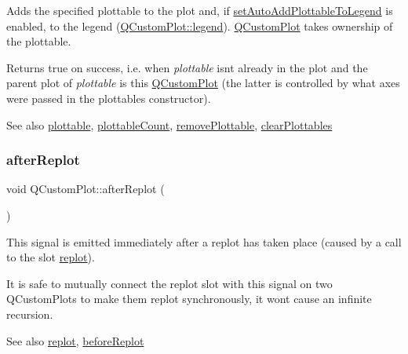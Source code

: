 Adds the specified plottable to the plot and, if \mbox{\hyperlink{class_q_custom_plot_ad8858410c2db47b7104040a3aa61c3fc}{set\+Auto\+Add\+Plottable\+To\+Legend}} is enabled, to the legend (\mbox{\hyperlink{class_q_custom_plot_a4eadcd237dc6a09938b68b16877fa6af}{Q\+Custom\+Plot\+::legend}}). \mbox{\hyperlink{class_q_custom_plot}{Q\+Custom\+Plot}} takes ownership of the plottable.

Returns true on success, i.\+e. when {\itshape plottable} isn\textquotesingle{}t already in the plot and the parent plot of {\itshape plottable} is this \mbox{\hyperlink{class_q_custom_plot}{Q\+Custom\+Plot}} (the latter is controlled by what axes were passed in the plottable\textquotesingle{}s constructor).

\begin{DoxySeeAlso}{See also}
\mbox{\hyperlink{class_q_custom_plot_a32de81ff53e263e785b83b52ecd99d6f}{plottable}}, \mbox{\hyperlink{class_q_custom_plot_a5f4f15991c14bf9ad659bb2a19dfbed4}{plottable\+Count}}, \mbox{\hyperlink{class_q_custom_plot_af3dafd56884208474f311d6226513ab2}{remove\+Plottable}}, \mbox{\hyperlink{class_q_custom_plot_a9a409bb3201878adb7ffba1c89c4e004}{clear\+Plottables}} 
\end{DoxySeeAlso}
\mbox{\label{class_q_custom_plot_a6f4fa624af060bc5919c5f266cf426a0}} 
\subsubsection{\texorpdfstring{after\+Replot}{afterReplot}}
{\footnotesize\ttfamily void Q\+Custom\+Plot\+::after\+Replot (\begin{DoxyParamCaption}{ }\end{DoxyParamCaption})\hspace{0.3cm}{\ttfamily [signal]}}

This signal is emitted immediately after a replot has taken place (caused by a call to the slot \mbox{\hyperlink{class_q_custom_plot_a606fd384b2a637ce2c24899bcbde77d6}{replot}}).

It is safe to mutually connect the replot slot with this signal on two Q\+Custom\+Plots to make them replot synchronously, it won\textquotesingle{}t cause an infinite recursion.

\begin{DoxySeeAlso}{See also}
\mbox{\hyperlink{class_q_custom_plot_a606fd384b2a637ce2c24899bcbde77d6}{replot}}, \mbox{\hyperlink{class_q_custom_plot_a0cd30e29b73efd6afe096e44bc5956f5}{before\+Replot}} 
\end{DoxySeeAlso}
\mbox{\label{class_q_custom_plot_abf635f8b56ab5c16d5de9f358543e82b}} 
